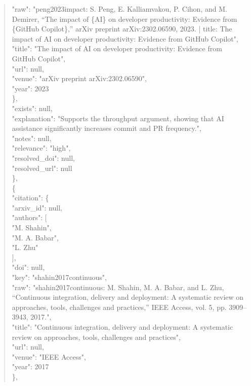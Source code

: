 \documentclass[11pt]{article}
\begin{document}
\begin{quote}
        "raw": "peng2023impact: S. Peng, E. Kalliamvakou, P. Cihon, and M. Demirer, ``The impact of \{AI\} on developer productivity: Evidence from \{GitHub Copilot\},'' arXiv preprint arXiv:2302.06590, 2023. | title: The impact of AI on developer productivity: Evidence from GitHub Copilot",\\
        "title": "The impact of AI on developer productivity: Evidence from GitHub Copilot",\\
        "url": null,\\
        "venue": "arXiv preprint arXiv:2302.06590",\\
        "year": 2023\\
      \},\\
      "exists": null,\\
      "explanation": "Supports the throughput argument, showing that AI assistance significantly increases commit and PR frequency.",\\
      "notes": null,\\
      "relevance": "high",\\
      "resolved\_doi": null,\\
      "resolved\_url": null\\
    \},\\
    \{\\
      "citation": \{\\
        "arxiv\_id": null,\\
        "authors": [\\
          "M. Shahin",\\
          "M. A. Babar",\\
          "L. Zhu"\\
        ],\\
        "doi": null,\\
        "key": "shahin2017continuous",\\
        "raw": "shahin2017continuous: M. Shahin, M. A. Babar, and L. Zhu, ``Continuous integration, delivery and deployment: A systematic review on approaches, tools, challenges and practices,'' IEEE Access, vol. 5, pp. 3909--3943, 2017.",\\
        "title": "Continuous integration, delivery and deployment: A systematic review on approaches, tools, challenges and practices",\\
        "url": null,\\
        "venue": "IEEE Access",\\
        "year": 2017\\
      \},\\

\end{quote}
\end{document}
